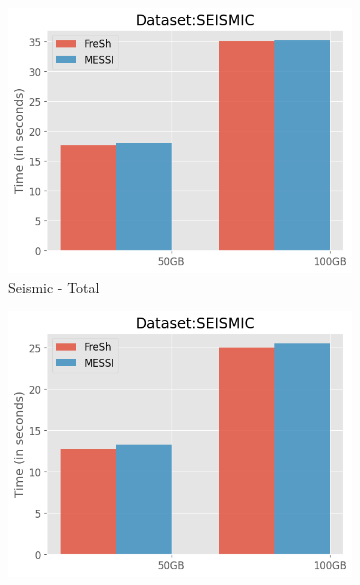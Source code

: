 
\begin{figure}[htbp]
    \centering
    \begin{subfigure}{0.45\textwidth}
        \includegraphics[width=\textwidth]{figures/Experiments/scale-dataset-seismic-total.png}
        \caption{Seismic - Total}
        \label{fig:eval:scale-dataset:seismic:total}
    \end{subfigure}
    \begin{subfigure}{0.45\textwidth}
        \includegraphics[width=\textwidth]{figures/Experiments/scale-dataset-seismic-query.png}

\end{subfigure}
\end{figure}
